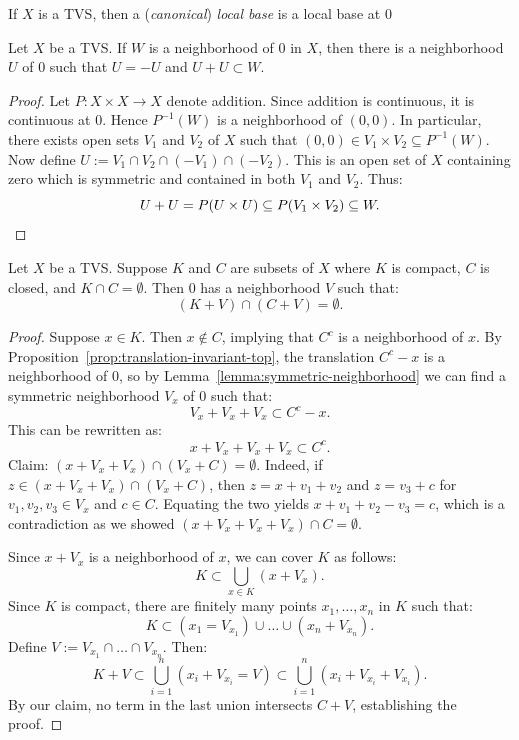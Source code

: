 \begin{definition}
	If $X$ is a TVS, then a (\emph{canonical}) \emph{local base} is a local base at $0$
\end{definition}

\begin{lemma}\label{lemma:symmetric-neighborhood}
	Let $X$ be a TVS. If $W$ is a neighborhood of $0$ in $X$, then there is a neighborhood $U$ of $0$ such that $U = -U$ and $U + U \subset W$.
\end{lemma}
	\begin{proof}
		Let $P:X \times X \rightarrow X$ denote addition. Since addition is continuous, it is continuous at $0$. Hence $P^{-1}(W)$ is a neighborhood of $(0,0)$. In particular, there exists open sets $V_1$ and $V_2$ of $X$ such that $(0,0) \in V_1 \times V_2 \subseteq P^{-1}(W)$.  Now define $U := V_1 \cap V_2 \cap (-V_1) \cap (-V_2)$. This is an open set of $X$ containing zero which is symmetric and contained in both $V_1$ and $V_2$. Thus:
		\[
			U+U = P(U \times U) \subseteq P(V_1 \times V_2) \subseteq W. \qedhere
		\] 
	\end{proof}

\begin{lemma}\label{lemma:add-disjoint}
	Let $X$ be a TVS. Suppose $K$ and $C$ are subsets of $X$ where $K$ is compact, $C$ is closed, and $K \cap C = \emptyset$. Then $0$ has a neighborhood $V$ such that:
	\[
		(K + V) \cap (C+V) = \emptyset.
	\] 
\end{lemma}
	\begin{proof}
		Suppose $x \in K$. Then $x \not\in C$, implying that $C^c$ is a neighborhood of $x$. By Proposition~\ref{prop:translation-invariant-top}, the translation $C^c - x$ is a neighborhood of $0$, so by Lemma~\ref{lemma:symmetric-neighborhood} we can find a symmetric neighborhood $V_x$ of $0$ such that:
		\[
			V_x + V_x + V_x \subset C^c - x.
		\] 
		This can be rewritten as:
		\[
			x + V_x + V_x + V_x \subset C^c.
		\] 
		Claim: $(x+V_x + V_x) \cap (V_x + C) = \emptyset$. Indeed, if $z \in (x + V_x + V_x) \cap (V_x + C)$, then $z = x+v_1+v_2$ and $z = v_3 + c$ for $v_1,v_2,v_3 \in V_x$ and $c \in C$. Equating the two yields $x+v_1+v_2 - v_3 = c$, which is a contradiction as we showed $(x + V_x + V_x + V_x) \cap C = \emptyset$.

	Since $x + V_x$ is a neighborhood of $x$, we can cover $K$ as follows:
		\[
			K \subset \bigcup_{x \in K}(x +V_x).
		\]
		Since $K$ is compact, there are finitely many points $x_1,\ldots ,x_n$ in $K$ such that:
		\[
			K \subset (x_1 = V_{x_1}) \cup \ldots \cup (x_n + V_{x_n}).
		\]
		Define $V:= V_{x_1} \cap \ldots \cap V_{x_n}$. Then:
		\[
			K+V \subset \bigcup_{i = 1}^n (x_i + V_{x_i} = V) \subset \bigcup_{i = 1}^n (x_i + V_{x_i} + V_{x_i}).
		\] 
		By our claim, no term in the last union intersects $C+V$, establishing the proof.
	\end{proof}

